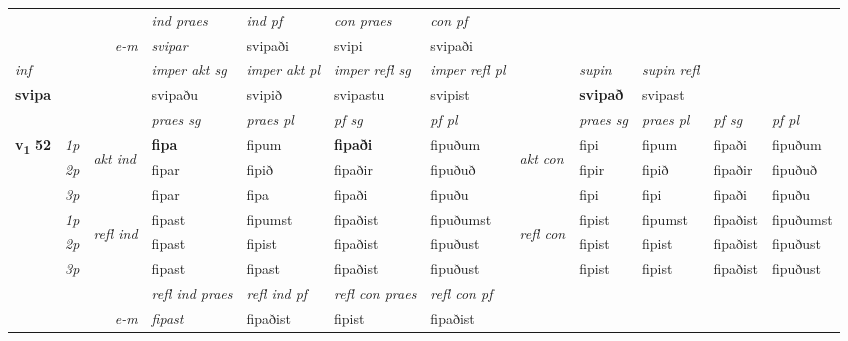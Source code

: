 \begin{longtable}[l]{X>{\footnotesize\itshape}llXXXXlXXXX}
   && &  \textit{ind praes} & \textit{ind pf} & \textit{con praes} & \textit{con pf} \\*
\multicolumn{3}{r}{\textit{e-m}} & svipar & svipaði & svipi & svipaði \\*

\cmidrule{4-7}
   {\textit{inf}} & &  & \textit{imper akt sg} & \textit{imper akt pl} & \textit{imper refl sg} & \textit{imper refl pl}  && \textit{supin} & \textit{supin refl}  \\*
  {\textbf{svipa}} & && svipaðu  & svipið & svipastu & svipist  &&  \textbf{svipað} & svipast  \\*

\midrule

 & &   & \textit{praes sg}  & \textit{praes pl}    & \textit{ pf sg} & \textit{pf pl} & & \textit{praes sg}  & \textit{praes pl}    & \textit{pf sg} & \textit{pf pl }  \\ \cmidrule{4-7} \cmidrule{9-12}
 \multirow{2}{*}{{{\textbf{v{\textsubscript{1}}} \Large{\textbf{52}}}}}  & 1p & \multirow{3}{*}{\begin{turn}{90}\textit{akt ind}\end{turn}} & \textbf{fipa} & fipum & \textbf{fipaði} & fipuðum & \multirow{3}{*}{\begin{turn}{90}\textit{akt con}\end{turn}} &fipi & fipum & fipaði & fipuðum\\*
 & 2p &  &  fipar  & fipið & fipaðir & fipuðuð & & fipir & fipið & fipaðir & fipuðuð \\*
 & 3p &  & fipar & fipa & fipaði & fipuðu & & fipi & fipi& fipaði & fipuðu \\*
\cmidrule{4-7} \cmidrule{9-12}
 & 1p & \multirow{3}{*}{\begin{turn}{90}\textit{refl ind}\end{turn}}  & fipast & fipumst & fipaðist & fipuðumst & \multirow{3}{*}{\begin{turn}{90}\textit{refl con}\end{turn}}  &fipist & fipumst & fipaðist & fipuðumst \\*
 & 2p &  & fipast & fipist & fipaðist & fipuðust & &fipist & fipist & fipaðist & fipuðust \\*
 & 3p  & & fipast & fipast & fipaðist & fipuðust & & fipist & fipist& fipaðist & fipuðust \\*
\cmidrule{4-7} \cmidrule{9-12}

 & && \textit{refl ind praes} & \textit{refl ind pf} & \textit{refl con praes} & \textit{refl con pf} \\*
\multicolumn{3}{r}{\textit{e-m}}& fipast & fipaðist & fipist & fipaðist \\*


\end{longtable}
